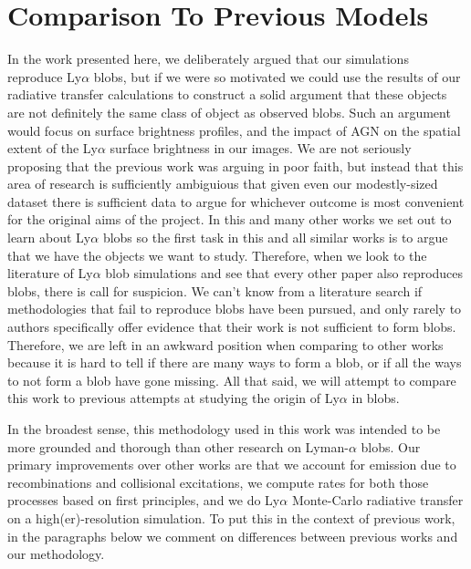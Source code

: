 \section{Comparison To Previous Models}
In the work presented here, we deliberately argued that our simulations reproduce Ly$\alpha$ blobs, but if we were so motivated we could use the results of our radiative transfer calculations to construct a solid argument that these objects are not definitely the same class of object as observed blobs.
Such an argument would focus on surface brightness profiles, and the impact of AGN on the spatial extent of the Ly$\alpha$ surface brightness in our images.
We are not seriously proposing that the previous work was arguing in poor faith, but instead that this area of research is sufficiently ambiguious that given even our modestly-sized dataset there is sufficient data to argue for whichever outcome is most convenient for the original aims of the project.
In this and many other works we set out to learn about Ly$\alpha$ blobs so the first task in this and all similar works is to argue that we have the objects we want to study.
Therefore, when we look to the literature of Ly$\alpha$ blob simulations and see that every other paper also reproduces blobs, there is call for suspicion.
We can't know from a literature search if methodologies that fail to reproduce blobs have been pursued, and only rarely to authors specifically offer evidence that their work is not sufficient to form blobs.
Therefore, we are left in an awkward position when comparing to other works because it is hard to tell if there are many ways to form a blob, or if all the ways to not form a blob have gone missing.
All that said, we will attempt to compare this work to previous attempts at studying the origin of Ly$\alpha$ in blobs.

In the broadest sense, this methodology used in this work was intended to be more grounded and thorough than other research on Lyman-$\alpha$ blobs.
Our primary improvements over other works are that we account for emission due to recombinations and collisional excitations, we compute rates for both those processes based on first principles, and we do Ly$\alpha$ Monte-Carlo radiative transfer on a high(er)-resolution simulation.
To put this in the context of previous work, in the paragraphs below we comment on differences between previous works and our methodology.

